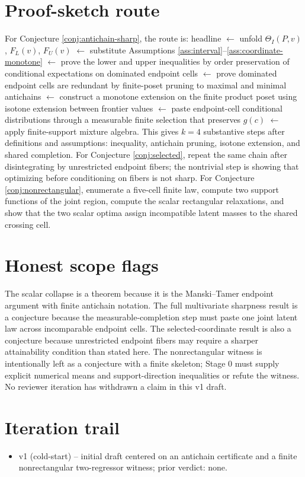 \documentclass[11pt]{article}
\theoremstyle{definition}
\theoremstyle{plain}
\theoremstyle{remark}
\begin{document}
\section{Proof-sketch route}
For Conjecture \ref{conj:antichain-sharp}, the route is: headline \(\leftarrow\) unfold \(\Theta_I(P,v)\), \(F_L(v)\), \(F_U(v)\) \(\leftarrow\) substitute Assumptions \ref{ass:interval}--\ref{ass:coordinate-monotone} \(\leftarrow\) prove the lower and upper inequalities by order preservation of conditional expectations on dominated endpoint cells \(\leftarrow\) prove dominated endpoint cells are redundant by finite-poset pruning to maximal and minimal antichains \(\leftarrow\) construct a monotone extension on the finite product poset using isotone extension between frontier values \(\leftarrow\) paste endpoint-cell conditional distributions through a measurable finite selection that preserves \(g(c)\) \(\leftarrow\) apply finite-support mixture algebra.  This gives \(k=4\) substantive steps after definitions and assumptions: inequality, antichain pruning, isotone extension, and shared completion.  For Conjecture \ref{conj:selected}, repeat the same chain after disintegrating by unrestricted endpoint fibers; the nontrivial step is showing that optimizing before conditioning on fibers is not sharp.  For Conjecture \ref{conj:nonrectangular}, enumerate a five-cell finite law, compute two support functions of the joint region, compute the scalar rectangular relaxations, and show that the two scalar optima assign incompatible latent masses to the shared crossing cell.

\section{Honest scope flags}
The scalar collapse is a theorem because it is the Manski--Tamer endpoint argument with finite antichain notation.  The full multivariate sharpness result is a conjecture because the measurable-completion step must paste one joint latent law across incomparable endpoint cells.  The selected-coordinate result is also a conjecture because unrestricted endpoint fibers may require a sharper attainability condition than stated here.  The nonrectangular witness is intentionally left as a conjecture with a finite skeleton; Stage 0 must supply explicit numerical means and support-direction inequalities or refute the witness.  No reviewer iteration has withdrawn a claim in this v1 draft.

\section{Iteration trail}
\begin{itemize}[leftmargin=2em]
\item v1 (cold-start) -- initial draft centered on an antichain certificate and a finite nonrectangular two-regressor witness; prior verdict: none.
\end{itemize}
\end{document}
